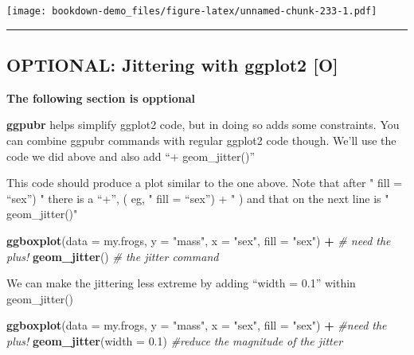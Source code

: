 \documentclass[]{book}
\newenvironment{Shaded}{\begin{snugshade}}{\end{snugshade}}
\newcommand{\KeywordTok}[1]{\textcolor[rgb]{0.13,0.29,0.53}{\textbf{#1}}}
\newcommand{\DataTypeTok}[1]{\textcolor[rgb]{0.13,0.29,0.53}{#1}}
\newcommand{\FloatTok}[1]{\textcolor[rgb]{0.00,0.00,0.81}{#1}}
\newcommand{\StringTok}[1]{\textcolor[rgb]{0.31,0.60,0.02}{#1}}
\newcommand{\CommentTok}[1]{\textcolor[rgb]{0.56,0.35,0.01}{\textit{#1}}}
\newcommand{\OperatorTok}[1]{\textcolor[rgb]{0.81,0.36,0.00}{\textbf{#1}}}
\newcommand{\NormalTok}[1]{#1}
\theoremstyle{definition}
\theoremstyle{definition}
\theoremstyle{definition}
\theoremstyle{remark}
\begin{document}
\texttt{[image: bookdown-demo\_files/figure-latex/unnamed-chunk-233-1.pdf]}

\begin{center}\rule{0.5\linewidth}{\linethickness}\end{center}

\subsection{OPTIONAL: Jittering with ggplot2
{[}O{]}}\label{optional-jittering-with-ggplot2-o}

\textbf{The following section is opptional}

\textbf{ggpubr} helps simplify ggplot2 code, but in doing so adds some
constraints. You can combine ggpubr commands with regular ggplot2 code
though. We'll use the code we did above and also add ``+
geom\_jitter()''

This code should produce a plot similar to the one above. Note that
after " fill = ``sex'') " there is a ``+'', ( eg, " fill = ``sex'') + "
) and that on the next line is " geom\_jitter()"

\begin{Shaded}
\begin{Highlighting}[]
\KeywordTok{ggboxplot}\NormalTok{(}\DataTypeTok{data =}\NormalTok{ my.frogs,}
          \DataTypeTok{y =} \StringTok{"mass"}\NormalTok{,}
          \DataTypeTok{x =} \StringTok{"sex"}\NormalTok{,}
          \DataTypeTok{fill =} \StringTok{"sex"}\NormalTok{) }\OperatorTok{+}\StringTok{  }\CommentTok{# need the plus!}
\StringTok{  }\KeywordTok{geom_jitter}\NormalTok{()            }\CommentTok{# the jitter command }
\end{Highlighting}
\end{Shaded}

We can make the jittering less extreme by adding ``width = 0.1'' within
geom\_jitter()

\begin{Shaded}
\begin{Highlighting}[]
\KeywordTok{ggboxplot}\NormalTok{(}\DataTypeTok{data =}\NormalTok{ my.frogs,}
          \DataTypeTok{y =} \StringTok{"mass"}\NormalTok{,}
          \DataTypeTok{x =} \StringTok{"sex"}\NormalTok{,}
          \DataTypeTok{fill =} \StringTok{"sex"}\NormalTok{) }\OperatorTok{+}\StringTok{  }\CommentTok{#need the plus!}
\StringTok{  }\KeywordTok{geom_jitter}\NormalTok{(}\DataTypeTok{width =} \FloatTok{0.1}\NormalTok{) }\CommentTok{#reduce the magnitude of the jitter}
\end{Highlighting}
\end{Shaded}
\end{document}
